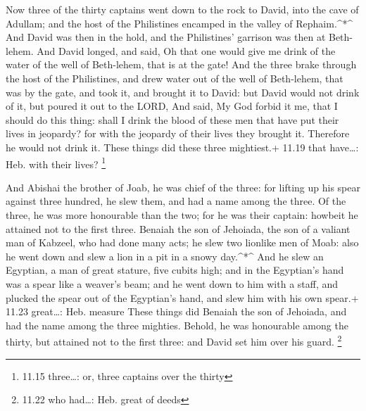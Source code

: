  Now three of the thirty captains went down to the rock to
David, into the cave of Adullam; and the host of the Philistines
encamped in the valley of Rephaim.\^{}*\^{}  And David was
then in the hold, and the Philistines' garrison was then at Beth-lehem.
 And David longed, and said, Oh that one would give me
drink of the water of the well of Beth-lehem, that is at the gate!
 And the three brake through the host of the Philistines,
and drew water out of the well of Beth-lehem, that was by the gate, and
took it, and brought it to David: but David would not drink of it, but
poured it out to the LORD,  And said, My God forbid it me,
that I should do this thing: shall I drink the blood of these men that
have put their lives in jeopardy? for with the jeopardy of their lives
they brought it. Therefore he would not drink it. These things did these
three mightiest.+ 11.19 that have\ldots: Heb. with their lives?
\footnote{11.15 three\ldots: or, three captains over the thirty}

 And Abishai the brother of Joab, he was chief of the
three: for lifting up his spear against three hundred, he slew them, and
had a name among the three.  Of the three, he was more
honourable than the two; for he was their captain: howbeit he attained
not to the first three.  Benaiah the son of Jehoiada, the
son of a valiant man of Kabzeel, who had done many acts; he slew two
lionlike men of Moab: also he went down and slew a lion in a pit in a
snowy day.\^{}*\^{}  And he slew an Egyptian, a man of
great stature, five cubits high; and in the Egyptian's hand was a spear
like a weaver's beam; and he went down to him with a staff, and plucked
the spear out of the Egyptian's hand, and slew him with his own spear.+
11.23 great\ldots: Heb. measure  These things did Benaiah
the son of Jehoiada, and had the name among the three mighties.
 Behold, he was honourable among the thirty, but attained
not to the first three: and David set him over his guard. \footnote{11.22
  who had\ldots: Heb. great of deeds}

